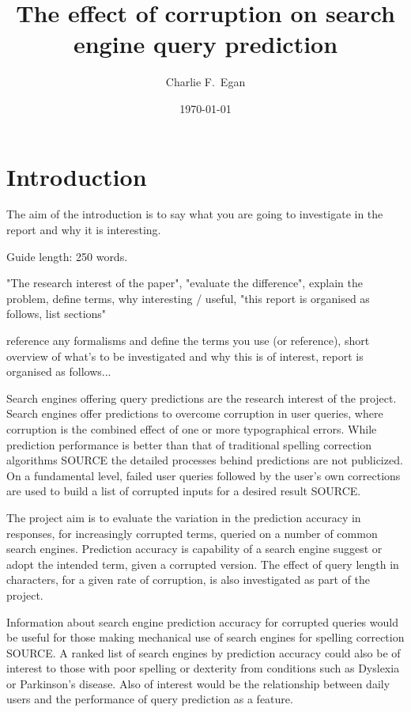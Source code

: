 \documentclass{csfourzero}
\title{The effect of corruption on search engine query prediction}
\author{Charlie F.\ Egan}
\date{\today}
\begin{document}
\maketitle

\section{Introduction}
\label{sec:intro}

The aim of the introduction is to say what you are going to investigate in the report and why it is interesting.

Guide length: 250 words.

"The research interest of the paper", "evaluate the difference", explain the problem, define terms, why interesting / useful, "this report is organised as follows, list sections"

reference any formalisms and define the terms you use (or reference), short overview of what's to be investigated and why this is of interest, report is organised as follows...

Search engines offering query predictions are the research interest of the project. Search engines offer predictions to overcome corruption in user queries, where corruption is the combined effect of one or more typographical errors. While prediction performance is better than that of traditional spelling correction algorithms SOURCE the detailed processes behind predictions are not publicized. On a fundamental level, failed user queries followed by the user's own corrections are used to build a list of corrupted inputs for a desired result SOURCE.

The project aim is to evaluate the variation in the prediction accuracy in responses, for increasingly corrupted terms, queried on a number of common search engines. Prediction accuracy is capability of a search engine suggest or adopt the intended term, given a corrupted version. The effect of query length in characters, for a given rate of corruption, is also investigated as part of the project.

Information about search engine prediction accuracy for corrupted queries would be useful for those making mechanical use of search engines for spelling correction SOURCE. A ranked list of search engines by prediction accuracy could also be of interest to those with poor spelling or dexterity from conditions such as Dyslexia or Parkinson's disease. Also of interest would be the relationship between daily users and the performance of query prediction as a feature.
\end{document}
